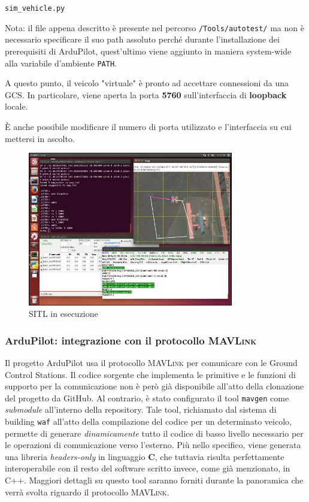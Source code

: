 \documentclass[a4paper, 12pt, oneside]{article}
\theoremstyle{definition}
\begin{document}
\begin{center}
    \texttt{sim\_vehicle.py}
\end{center}

Nota: il file appena descritto è presente nel percorso \texttt{/Tools/autotest/} ma non è necessario specificare il suo path assoluto perché durante l'installazione dei prerequisiti di ArduPilot, quest'ultimo viene aggiunto in maniera system-wide alla variabile d'ambiente \texttt{PATH}.

A questo punto, il veicolo "virtuale" è pronto ad accettare connessioni da una GCS. In particolare, viene aperta la porta \textbf{5760} sull'interfaccia di \textbf{loopback} locale.

È anche possibile modificare il numero di porta utilizzato e l'interfaccia su cui mettersi in ascolto.

\begin{figure}[H]
    \centering
    \includegraphics[width=0.8\textwidth]{images/sitl.jpg}
    \caption{SITL in esecuzione}
\end{figure}



\subsubsection{ArduPilot: integrazione con il protocollo \textsc{MAVLink}}
Il progetto ArduPilot usa il protocollo \textsc{MAVLink} per comunicare con le Ground Control Stations. Il codice sorgente che implementa le primitive e le funzioni di supporto per la comunicazione non è però già disponibile all'atto della clonazione del progetto da GitHub. Al contrario, è stato configurato il tool \texttt{mavgen} come \textit{submodule} all'interno della repository. Tale tool, richiamato dal sistema di building \texttt{waf} all'atto della compilazione del codice per un determinato veicolo, permette di generare \textit{dinamicamente} tutto il codice di basso livello necessario per le operazioni di comunicazione verso l'esterno\cite{mavgen}. Più nello specifico, viene generata una libreria \textit{headers-only} in linguaggio \textbf{C}, che tuttavia risulta perfettamente interoperabile con il resto del software scritto invece, come già menzionato, in C++. Maggiori dettagli su questo tool saranno forniti durante la panoramica che verrà svolta riguardo il protocollo \textsc{MAVLink}.
\end{document}
